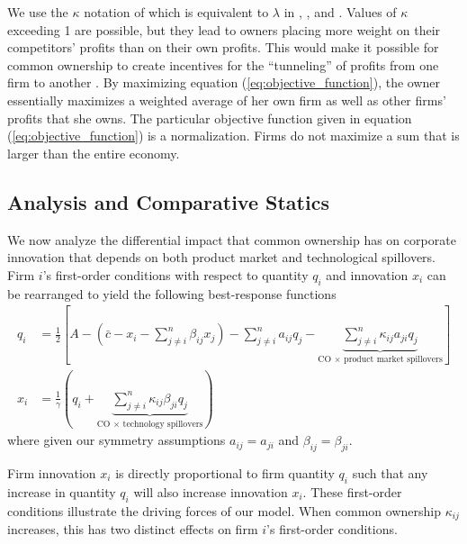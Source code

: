 \documentclass[12pt]{article}
\begin{document}
We use the $\kappa$ notation of \cite{backus2021common} which is equivalent to $\lambda$ in \cite{azar2012new}, \cite{lopez2016cross}, and \cite{azar2020oligopoly}. Values of $\kappa$ exceeding 1 are possible, but they lead to owners placing more weight on their competitors' profits than on their own profits. This would make it possible for common ownership to create incentives for the ``tunneling'' of profits from one firm to another \citep{johnson2000tunneling}. By maximizing equation (\ref{eq:objective_function}), the owner essentially maximizes a weighted average of her own firm as well as other firms' profits that she owns. The particular objective function given in equation (\ref{eq:objective_function}) is a normalization. Firms do not maximize a sum that is larger than the entire economy. 

\subsection{Analysis and Comparative Statics}

We now analyze the differential impact that common ownership has on corporate innovation that depends on both product market and technological spillovers. Firm $i$'s first-order conditions with respect to quantity $q_{i}$ and innovation $x_{i}$ can be rearranged to yield the following best-response functions
\begin{align}
q_{i} &= \frac{1}{2} \left[ A - \left( \bar{c} - x_{i} - \sum_{j \neq i}^{n} \beta_{ij} x_{j} \right) - \sum_{j \neq i}^{n} a_{ij} q_{j} - \underbrace{\sum_{j \neq i}^{n} \kappa_{ij} a_{ji} q_{j}}_{\textrm{CO $\times$ product market spillovers}}  \right] \label{BR_quantity} \\
x_{i} &= \frac{1}{\gamma} \left(q_{i} + \underbrace{\sum_{j \neq i}^{n} \kappa_{ij} \beta_{ji} q_{j}}_{\textrm{CO $\times$ technology spillovers} } \right) 
\label{BR_innovation}
\end{align}
where given our symmetry assumptions $a_{ij} = a_{ji}$ and $\beta_{ij} = \beta_{ji}$.

Firm innovation $x_{i}$ is directly proportional to firm quantity $q_{i}$ such that any increase in quantity $q_{i}$ will also increase innovation $x_{i}$. These first-order conditions illustrate the driving forces of our model. When common ownership $\kappa_{ij}$ increases, this has two distinct effects on firm $i$'s first-order conditions. 
\end{document}
